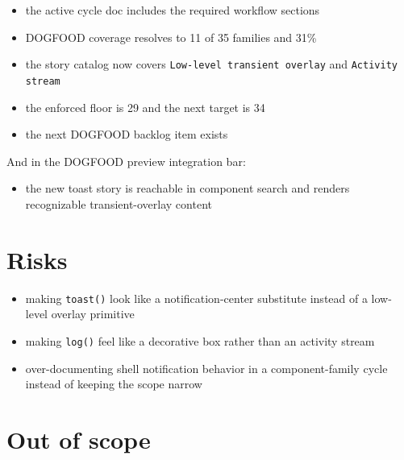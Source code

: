 \begin{itemize}
\tightlist
\item
  the active cycle doc includes the required workflow sections
\item
  DOGFOOD coverage resolves to 11 of 35 families and 31\%
\item
  the story catalog now covers \texttt{L\allowbreak{}o\allowbreak{}w\allowbreak{}-\allowbreak{}l\allowbreak{}e\allowbreak{}v\allowbreak{}e\allowbreak{}l\allowbreak{} \allowbreak{}t\allowbreak{}r\allowbreak{}a\allowbreak{}n\allowbreak{}s\allowbreak{}i\allowbreak{}e\allowbreak{}n\allowbreak{}t\allowbreak{} \allowbreak{}o\allowbreak{}v\allowbreak{}e\allowbreak{}r\allowbreak{}l\allowbreak{}a\allowbreak{}y} and \texttt{A\allowbreak{}c\allowbreak{}t\allowbreak{}i\allowbreak{}v\allowbreak{}i\allowbreak{}t\allowbreak{}y\allowbreak{} \allowbreak{}s\allowbreak{}t\allowbreak{}r\allowbreak{}e\allowbreak{}a\allowbreak{}m}
\item
  the enforced floor is 29 and the next target is 34
\item
  the next DOGFOOD backlog item exists
\end{itemize}

And in the DOGFOOD preview integration bar:

\begin{itemize}
\tightlist
\item
  the new toast story is reachable in component search and renders recognizable transient-overlay content
\end{itemize}

\section{Risks}\label{record-069-risks}

\begin{itemize}
\tightlist
\item
  making \texttt{t\allowbreak{}o\allowbreak{}a\allowbreak{}s\allowbreak{}t\allowbreak{}(\allowbreak{})} look like a notification-center substitute instead of a low-level overlay primitive
\item
  making \texttt{l\allowbreak{}o\allowbreak{}g\allowbreak{}(\allowbreak{})} feel like a decorative box rather than an activity stream
\item
  over-documenting shell notification behavior in a component-family cycle instead of keeping the scope narrow
\end{itemize}

\section{Out of scope}\label{record-069-out-of-scope}

